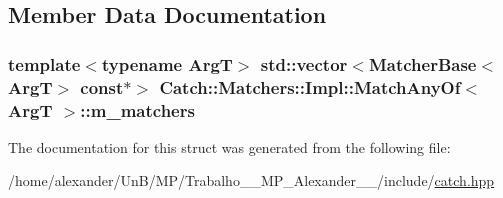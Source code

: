 \subsection{Member Data Documentation}
\hypertarget{structCatch_1_1Matchers_1_1Impl_1_1MatchAnyOf_a1fb1119e6110dc15b8d5262ec0aeddd5}{
\subsubsection[{m\-\_\-matchers}]{\setlength{\rightskip}{0pt plus 5cm}template$<$typename Arg\-T$>$ std\-::vector$<${\bf Matcher\-Base}$<$Arg\-T$>$ const$\ast$$>$ {\bf Catch\-::\-Matchers\-::\-Impl\-::\-Match\-Any\-Of}$<$ Arg\-T $>$\-::m\-\_\-matchers}}\label{structCatch_1_1Matchers_1_1Impl_1_1MatchAnyOf_a1fb1119e6110dc15b8d5262ec0aeddd5}


The documentation for this struct was generated from the following file\-:\begin{DoxyCompactItemize}
\item 
/home/alexander/\-Un\-B/\-M\-P/\-Trabalho\-\_\-\_\-\-M\-P\-\_\-\-Alexander\-\_\-\_/include/\hyperlink{catch_8hpp}{catch.\-hpp}\end{DoxyCompactItemize}
